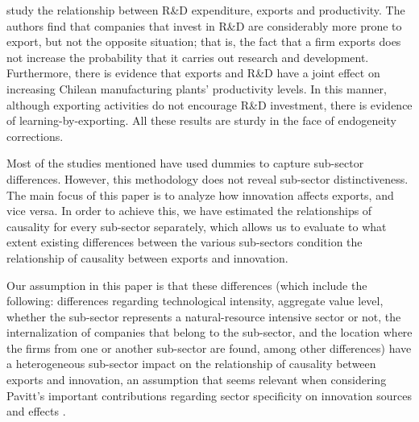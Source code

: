 \cite{BenaventeBravoGonzalez2014} study the relationship between R\&D expenditure, exports and productivity. The authors find that companies that invest in R\&D are considerably more prone to export, but not the opposite situation; that is, the fact that a firm exports does not increase the probability that it carries out research and development. Furthermore, there is evidence that exports and R\&D have a joint effect on increasing Chilean manufacturing plants' productivity levels. In this manner, although exporting activities do not encourage R\&D investment, there is evidence of learning-by-exporting. All these results are sturdy in the face of endogeneity corrections.

Most of the studies mentioned have used dummies to capture sub-sector differences. However, this methodology does not reveal sub-sector distinctiveness. The main focus of this paper is to analyze how innovation affects exports, and vice versa. In order to achieve this, we have estimated the relationships of causality for every sub-sector separately,  which allows us to evaluate to what extent existing differences between the various sub-sectors condition the relationship of causality between exports and innovation.

Our assumption in this paper is that these differences (which include the following: differences regarding technological intensity, aggregate value level, whether the sub-sector represents a natural-resource intensive sector or not, the internalization of companies that belong to the sub-sector, and the location where the firms from one or another sub-sector are found, among other differences) have a heterogeneous sub-sector impact on the relationship of causality between exports and innovation, an assumption that seems relevant when considering Pavitt's important contributions regarding sector specificity on innovation sources and effects \citep{Pavitt1984}.
